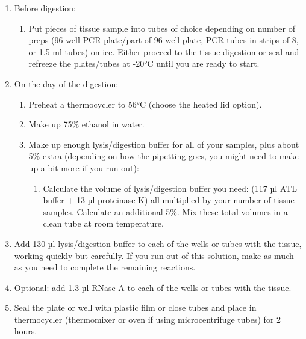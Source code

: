 \documentclass[
  letterpaper,
  DIV=11,
  numbers=noendperiod]{scrreprt}
\providecommand{\tightlist}{%
  \setlength{\itemsep}{0pt}\setlength{\parskip}{0pt}}\usepackage{longtable,booktabs,array}
\begin{document}
\begin{enumerate}
\def\labelenumi{\arabic{enumi}.}
\item
  Before digestion:

  \begin{enumerate}
  \def\labelenumii{\alph{enumii}.}
  \tightlist
  \item
    Put pieces of tissue sample into tubes of choice depending on number
    of preps (96-well PCR plate/part of 96-well plate, PCR tubes in
    strips of 8, or 1.5 ml tubes) on ice. Either proceed to the tissue
    digestion or seal and refreeze the plates/tubes at -20°C until you
    are ready to start.
  \end{enumerate}
\item
  On the day of the digestion:

  \begin{enumerate}
  \def\labelenumii{\alph{enumii}.}
  \item
    Preheat a thermocycler to 56°C (choose the heated lid option).
  \item
    Make up 75\% ethanol in water.
  \item
    Make up enough lysis/digestion buffer for all of your samples, plus
    about 5\% extra (depending on how the pipetting goes, you might need
    to make up a bit more if you run out):

    \begin{enumerate}
    \def\labelenumiii{\roman{enumiii}.}
    \tightlist
    \item
      Calculate the volume of lysis/digestion buffer you need: (117 µl
      ATL buffer + 13 µl proteinase K) all multiplied by your number of
      tissue samples. Calculate an additional 5\%. Mix these total
      volumes in a clean tube at room temperature.
    \end{enumerate}
  \end{enumerate}
\item
  Add 130 µl lysis/digestion buffer to each of the wells or tubes with
  the tissue, working quickly but carefully. If you run out of this
  solution, make as much as you need to complete the remaining
  reactions.
\item
  Optional: add 1.3 µl RNase A to each of the wells or tubes with the
  tissue.
\item
  Seal the plate or well with plastic film or close tubes and place in
  thermocycler (thermomixer or oven if using microcentrifuge tubes) for
  2 hours.

  \begin{tcolorbox}[enhanced jigsaw, toprule=.15mm, breakable, coltitle=black, leftrule=.75mm, title=\textcolor{quarto-callout-warning-color}{\faExclamationTriangle}\hspace{0.5em}{NOTE}, bottomrule=.15mm, toptitle=1mm, bottomtitle=1mm, colframe=quarto-callout-warning-color-frame, opacityback=0, colback=white, opacitybacktitle=0.6, colbacktitle=quarto-callout-warning-color!10!white, rightrule=.15mm, titlerule=0mm, arc=.35mm, left=2mm]


\end{tcolorbox}
\end{enumerate}
\end{document}
